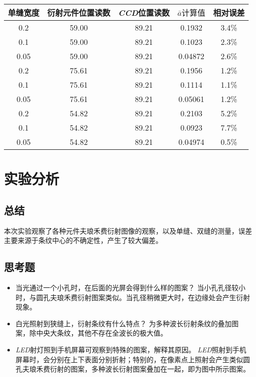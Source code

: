 \documentclass[a4paper]{ltxdoc}
\begin{document}
\begin{tabular}{|c|c|c|c|c|}
    \hline 单缝宽度 & 衍射元件位置读数 & \textit{CCD}位置读数 & $\bar{a} 计算值$ & 相对误差 \\
    \hline 0.2      & 59.00            & 89.21                & 0.1932           & 3.4\%    \\
    \hline 0.1      & 59.00            & 89.21                & 0.1023           & 2.3\%    \\
    \hline 0.05     & 59.00            & 89.21                & 0.04872          & 2.6\%    \\\hline

    \hline 0.2      & 75.61            & 89.21                & 0.1956           & 1.2\%    \\
    \hline 0.1      & 75.61            & 89.21                & 0.1114           & 1.1\%    \\
    \hline 0.05     & 75.61            & 89.21                & 0.05061          & 1.2\%    \\\hline

    \hline 0.2      & 54.82            & 89.21                & 0.2103           & 5.2\%    \\
    \hline 0.1      & 54.82            & 89.21                & 0.0923           & 7.7\%    \\
    \hline 0.05     & 54.82            & 89.21                & 0.04974          & 0.5\%    \\\hline
\end{tabular}
\section{实验分析}
\subsection{总结}
本次实验观察了各种元件夫琅禾费衍射图像的观察，以及单缝、双缝的测量，误差主要来源于条纹中心的不确定性，产生了较大偏差。
\subsection{思考题}
\begin{itemize}
    \item 当光通过一个小孔时，在后面的光屏会得到什么样的图案？
          当小孔孔径较小时，与圆孔夫琅禾费衍射图案类似。当孔径稍微更大时，在边缘处会产生衍射现象。
    \item 白光照射到狭缝上，衍射条纹有什么特点？
          为多种波长衍射条纹的叠加图案，除中央大条纹，其他不存在全波长的极大值。
    \item \textit{LED}射灯照到手机屏幕可观察到特殊的图案，解释其原因。
          \textit{LED}照射到手机屏幕时，会分别在上下表面分别折射；特别的，在像素点上照射会产生类似圆孔夫琅禾费衍射的图案，多种波长衍射图案叠加在一起，即为图中所示图案。
\end{itemize}
\end{document}
